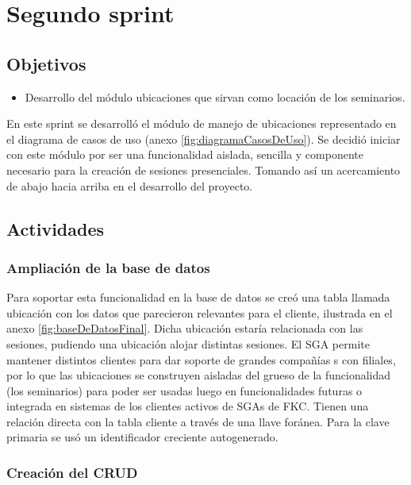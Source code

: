 \section{Segundo sprint} %
\label{sec:segundo_sprint}

\subsection{Objetivos}

\begin{itemize}
	\item Desarrollo del módulo ubicaciones que sirvan como locación de los seminarios.
\end{itemize}

En este sprint se desarrolló el módulo de manejo de ubicaciones representado en el diagrama de casos de uso (anexo \ref{fig:diagramaCasosDeUso}). Se decidió iniciar con este módulo por ser una funcionalidad aislada, sencilla y componente necesario para la creación de sesiones presenciales. Tomando así un acercamiento de abajo hacia arriba en el desarrollo del proyecto.

\subsection{Actividades} %
\label{sub:actividades2}

\subsubsection{Ampliación de la base de datos}

Para soportar esta funcionalidad en la base de datos se creó una tabla llamada ubicación con los datos que parecieron relevantes para el cliente, ilustrada en el anexo \ref{fig:baseDeDatosFinal}. Dicha ubicación estaría relacionada con las sesiones, pudiendo una ubicación alojar distintas sesiones. El SGA permite mantener distintos clientes para dar soporte de grandes compañías
s con filiales, por lo que las ubicaciones se construyen aisladas del grueso de la funcionalidad (los seminarios) para poder ser usadas luego en funcionalidades futuras o integrada en sistemas de los clientes activos de SGAs de FKC. Tienen una relación directa con la tabla cliente a través de una llave foránea. Para la clave primaria se usó un identificador creciente autogenerado.

\subsubsection{Creación del CRUD}

